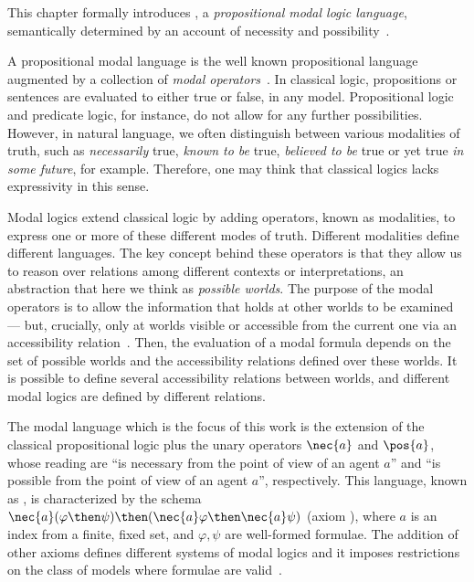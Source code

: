 This chapter formally introduces , a \emph{propositional modal
logic language}, semantically determined by an account of necessity and
possibility~\cite{journals/jal/NalonD07}.

A propositional modal language is the well known propositional language augmented
by a collection of \emph{modal operators}~\cite{blackburn2002modal}. In
classical logic, propositions or sentences are evaluated to either true or
false, in any model. Propositional logic and predicate logic, for instance, do
not allow for any further possibilities. However, in natural language, we often
distinguish between various modalities of truth, such as \emph{necessarily}
true, \emph{known to be} true, \emph{believed to be} true or yet true \emph{in
some future}, for example.  Therefore, one may think that classical logics lacks
expressivity in this sense. 

Modal logics extend classical logic by adding operators, known as modalities, to
express one or more of these different modes of truth. Different modalities
define different languages. The key concept behind these operators is that they
allow us to reason over relations among different contexts or interpretations,
an abstraction that here we think as \emph{possible worlds}.  The purpose of the
modal operators is to allow the information that holds at other worlds to be
examined --- but, crucially, only at worlds visible or accessible from the
current one via an accessibility relation~\cite{blackburn2002modal}. Then, the
evaluation of a modal formula depends on the set of possible worlds and the
accessibility relations defined over these worlds. It is possible to define
several accessibility relations between worlds, and different modal logics are
defined by different relations.

The modal language which is the focus of this work is the extension of the
classical propositional logic plus the unary operators $\nec{a}$ and $\pos{a}$,
whose reading are ``is necessary from the point of view of an agent $a$'' and
``is possible from the point of view of an agent $a$'', respectively. This
language, known as , is characterized by the schema
$\nec{a}(\varphi \then \psi) \then (\nec{a} \varphi \then \nec{a} \psi)$ (axiom
), where $a$ is an index from a finite, fixed set, and $\varphi,
\psi$ are well-formed formulae. The addition of other axioms defines different
systems of modal logics and it imposes restrictions on the class of models where
formulae are valid~\cite{chellas:modal_logic}. 

